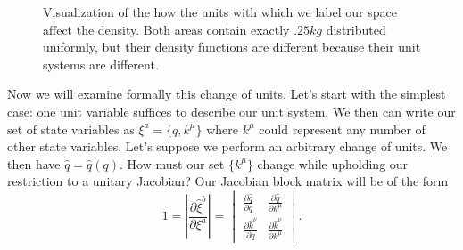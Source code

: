 \documentclass{article}[a4paper]
\begin{document}
	
%

\begin{center}
\begin{figure}[h!]
\hspace{1cm}
\caption{Visualization of the how the units with which we label our space affect the density. Both areas contain exactly $.25kg$ distributed uniformly, but their density functions are different because their unit systems are different.}
\end{figure}
\end{center}

	Now we will examine formally this change of units. Let's start with the simplest case: one unit variable suffices to describe our unit system. We then can write our set of state variables as $\xi^a = \{q,k^\mu\}$ where $k^\mu$ could represent any number of other state variables. Let's suppose we perform an arbitrary change of units. We then have $\hat{q} = \hat{q}(q)$. How must our set $\{k^\mu\}$ change while upholding our restriction to a unitary Jacobian? Our Jacobian block matrix will be of the form $$1 = \left|\frac{\partial\hat{\xi}^b}{\partial\xi^a}\right| = \begin{vmatrix}
\frac{\partial \hat{q}}{\partial q} & \frac{\partial \hat{q}}{\partial k^\mu} \\
\frac{\partial \hat{k}^\nu}{\partial q} & \frac{\partial \hat{k}^\nu}{\partial k^\mu}
\end{vmatrix}.$$
\end{document}
